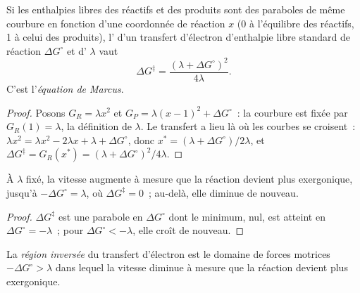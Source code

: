 \begin{theorem}\label{thm:b3:complex-mechanisms:marcus}
Si les enthalpies libres des réactifs et des produits sont des paraboles de
même courbure en fonction d'une coordonnée de réaction $x$ (0 à l'équilibre
des réactifs, 1 à celui des produits), l' d'un
transfert d'électron d'enthalpie libre standard de réaction $\Delta G^\circ$
et d' $\lambda$ vaut
\[
  \Delta G^{\ddagger} = \frac{(\lambda + \Delta G^\circ)^2}{4\lambda} .
\]
C'est l'\emph{équation de Marcus}.
\end{theorem}

\begin{proof}
Posons $G_R = \lambda x^2$ et $G_P = \lambda(x - 1)^2 + \Delta G^\circ$~: la courbure est fixée par $G_R(1) = \lambda$,
la définition de $\lambda$. Le transfert a lieu là où les courbes se
croisent~: $\lambda x^2 = \lambda x^2 - 2\lambda x + \lambda +
\Delta G^\circ$, donc $x^\ast = (\lambda + \Delta G^\circ)/2\lambda$, et $\Delta G^{\ddagger} = G_R(x^\ast) = (\lambda + \Delta G^\circ)^2/4\lambda$.
\end{proof}

\begin{corollary}\label{cor:b3:complex-mechanisms:inverted}
À $\lambda$ fixé, la vitesse augmente à mesure que la réaction devient plus
exergonique, jusqu'à $-\Delta G^\circ = \lambda$, où $\Delta G^{\ddagger} = 0$~; au-delà, elle
diminue de nouveau.
\end{corollary}

\begin{proof}
$\Delta G^{\ddagger}$ est une parabole en $\Delta G^\circ$ dont le minimum, nul, est atteint en $\Delta G^\circ = -\lambda$~;
pour $\Delta G^\circ < -\lambda$, elle croît de nouveau.
\end{proof}

\begin{definition}\label{def:b3:complex-mechanisms:inverted}
La \emph{région inversée} du transfert
d'électron est le domaine de forces motrices $-\Delta G^\circ > \lambda$ dans lequel la vitesse
diminue à mesure que la réaction devient plus exergonique.
\end{definition}

